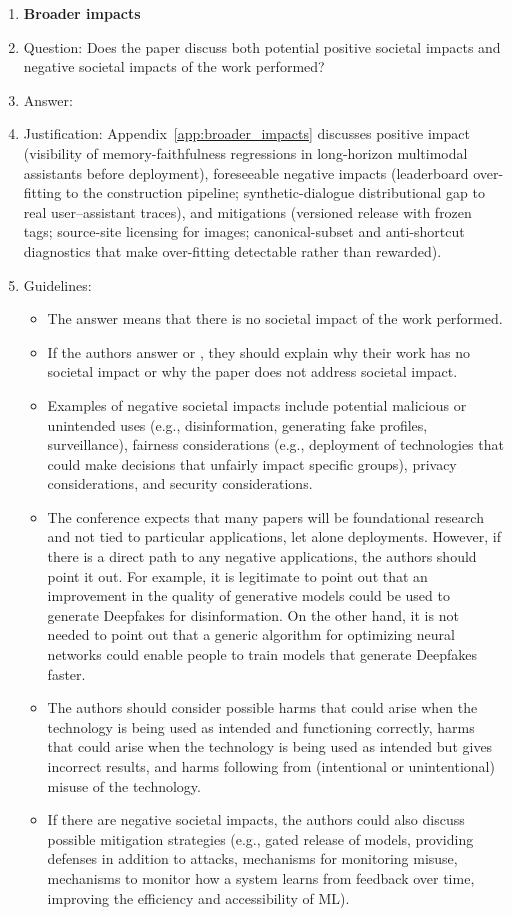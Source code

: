 \documentclass{article}
\begin{document}
\begin{enumerate}
\item {\bf Broader impacts}
    \item[] Question: Does the paper discuss both potential positive societal impacts and negative societal impacts of the work performed?
    \item[] Answer: \answerYes{}
    \item[] Justification: Appendix~\ref{app:broader_impacts} discusses positive impact (visibility of memory-faithfulness regressions in long-horizon multimodal assistants before deployment), foreseeable negative impacts (leaderboard over-fitting to the construction pipeline; synthetic-dialogue distributional gap to real user--assistant traces), and mitigations (versioned release with frozen tags; source-site licensing for images; canonical-subset and anti-shortcut diagnostics that make over-fitting detectable rather than rewarded).
    \item[] Guidelines:
    \begin{itemize}
        \item The answer \answerNA{} means that there is no societal impact of the work performed.
        \item If the authors answer \answerNA{} or \answerNo, they should explain why their work has no societal impact or why the paper does not address societal impact.
        \item Examples of negative societal impacts include potential malicious or unintended uses (e.g., disinformation, generating fake profiles, surveillance), fairness considerations (e.g., deployment of technologies that could make decisions that unfairly impact specific groups), privacy considerations, and security considerations.
        \item The conference expects that many papers will be foundational research and not tied to particular applications, let alone deployments. However, if there is a direct path to any negative applications, the authors should point it out. For example, it is legitimate to point out that an improvement in the quality of generative models could be used to generate Deepfakes for disinformation. On the other hand, it is not needed to point out that a generic algorithm for optimizing neural networks could enable people to train models that generate Deepfakes faster.
        \item The authors should consider possible harms that could arise when the technology is being used as intended and functioning correctly, harms that could arise when the technology is being used as intended but gives incorrect results, and harms following from (intentional or unintentional) misuse of the technology.
        \item If there are negative societal impacts, the authors could also discuss possible mitigation strategies (e.g., gated release of models, providing defenses in addition to attacks, mechanisms for monitoring misuse, mechanisms to monitor how a system learns from feedback over time, improving the efficiency and accessibility of ML).
    \end{itemize}


\end{enumerate}
\end{document}
